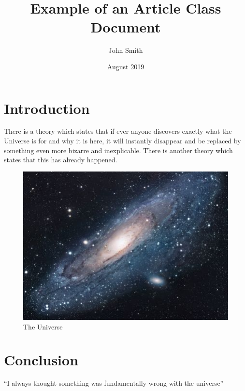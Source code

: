 

\usepackage[utf8]{inputenc}
\usepackage{natbib}
\usepackage{graphicx}

\title{Example of an Article Class Document}
\author{John Smith}
\date{August 2019}



\section{Introduction}
There is a theory which states that if ever anyone discovers exactly what the
Universe is for and why it is here, it will instantly disappear and be replaced
by something even more bizarre and inexplicable. There is another theory which
states that this has already happened.

\begin{figure}[h!]
    \centering
    \includegraphics[scale=1.7]{universe}
    \caption{The Universe}
    \label{fig:universe}
\end{figure}

\section{Conclusion}
``I always thought something was fundamentally wrong with the universe''
\citep{adams1995hitchhiker}







